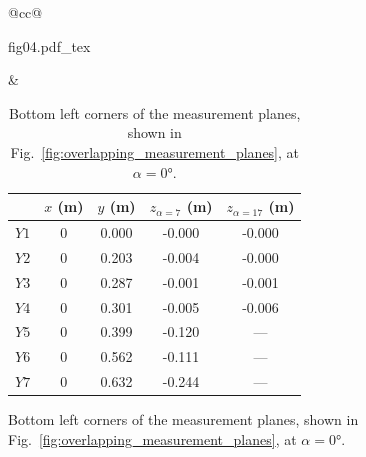\documentclass[wes, manuscript]{copernicus}
\begin{document}
\begin{figure}[htp]
    \centering
    \begin{tabular}{@{}cc@{}}
        \begin{minipage}{0.45\textwidth}
            \centering
            \def\svgwidth{.99\linewidth}
            {fig04.pdf_tex}
            \caption{Arrangement of the measurement planes along the span, for $\alpha = 7$\unit{\degree} at 10\% $x/c$ aft of the mid-span leading edge.}
            \label{fig:measurement_planes}
        \end{minipage}
        &
        \begin{minipage}{0.45\textwidth}
            \centering
            \small
            \begin{table}[H]
                \caption{Bottom left corners of the measurement planes, shown in Fig.~\ref{fig:overlapping_measurement_planes}, at $\alpha = 0\unit{\degree}$.}
                \label{tab:measurement_plane_locations}
                \begin{tabular}{l c c c c}
                    \hline
                    & $x$ (\unit{m}) & $y$ (\unit{m}) & $z_{\alpha=7}$ (\unit{m}) & $z_{\alpha=17}$ (\unit{m}) \\ \hline
                    $Y1$ & 0 & 0.000 & -0.000 & -0.000 \\
                    $Y2$ & 0 & 0.203 & -0.004 & -0.000 \\
                    $Y3$ & 0 & 0.287 & -0.001 & -0.001 \\
                    $Y4$ & 0 & 0.301 & -0.005 & -0.006 \\
                    $Y5$ & 0 & 0.399 & -0.120 & --- \\
                    $Y6$ & 0 & 0.562 & -0.111 & --- \\
                    $Y7$ & 0 & 0.632 & -0.244 & --- \\ \hline
                \end{tabular}
            \end{table}
        \end{minipage}
    \end{tabular}
\end{figure}
%
\end{document}
